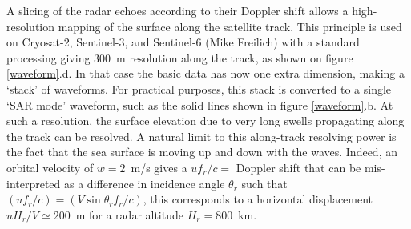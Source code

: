 A slicing of the radar echoes according to their Doppler shift allows a high-resolution mapping of the surface along the satellite track. 
This principle is used on  Cryosat-2, Sentinel-3, and Sentinel-6 (Mike Freilich) with a standard processing giving 300~m resolution along the track, as shown on figure \ref{waveform}.d. In that case the basic 
data has now one extra dimension, making a `stack' of waveforms. For practical purposes, this stack is converted to a single `SAR mode' waveform, such as the solid lines 
shown in figure \ref{waveform}.b. 
At such a  resolution, the surface elevation due to  very long swells propagating along the track can be resolved. 
A natural limit to this along-track resolving power is the fact that the sea surface is moving up and down with the waves. Indeed, an orbital velocity 
of $w=2$~m/s gives a $u f_r / c=$ Doppler shift that can be mis-interpreted as a difference in incidence angle $\theta_r$ such that  
$(u f_r / c)=(V \sin\theta_r  f_r/c)$, this corresponds to a horizontal displacement $u H_r/V \simeq 200$~m for a radar altitude 
$H_r = 800$~km. 





